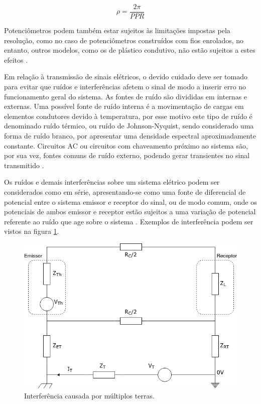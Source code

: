 \begin{equation}
    \label{eq:res_encoder}
    \rho = \frac{2\pi}{PPR}
\end{equation}

Potenciômetros podem também estar sujeitos às limitações impostas 
pela resolução, como no caso de potenciômetros construídos com fios 
enrolados, no entanto, outros modelos, como os de plástico condutivo,
não estão sujeitos a estes efeitos \cite{bentley2005principles}.

Em relação à transmissão de sinais elétricos, o devido cuidado deve
ser tomado para evitar que ruídos e interferências afetem o sinal de 
modo a inserir erro no funcionamento geral do sistema. 
As fontes de ruído são divididas em internas e externas. Uma possível fonte de
ruído interna é a movimentação de cargas em elementos condutores 
devido à temperatura, por esse motivo este tipo de ruído é denominado 
ruído térmico, ou ruído de Johnson-Nyquist, sendo considerado uma forma de
ruído branco, por apresentar uma densidade espectral aproximadamente 
constante. Circuitos AC ou circuitos com chaveamento próximo ao sistema 
são, por sua vez, fontes comuns de ruído externo, 
podendo gerar transientes no sinal transmitido \cite{bentley2005principles}.

Os ruídos e demais interferências sobre um sistema elétrico podem ser 
considerados como em série, apresentando-se como uma fonte de 
diferencial de potencial entre o sistema emissor e receptor do sinal, 
ou de modo comum, onde os potenciais de ambos emissor e receptor estão
sujeitos a uma variação de potencial referente ao ruído que age sobre o sistema \cite{bentley2005principles}.
Exemplos de interferência podem ser vistos na figura \ref{fig:interferencia}.

\begin{figure}[h]
    \caption{Interferência causada por múltiplos terras.}    
    
    \begin{centering}
        \includegraphics[width=0.65\columnwidth]{images/fundamentos/Interferencia.png}
    \par\end{centering}

    \label{fig:interferencia}
\end{figure}


